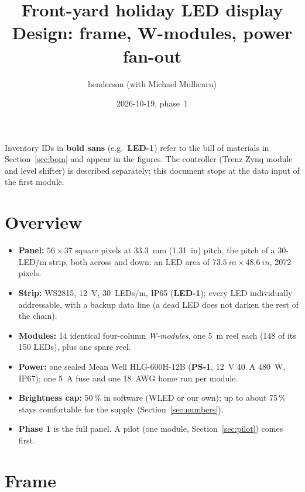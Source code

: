 \documentclass[11pt,letterpaper]{article}
\title{Front-yard holiday LED display\\[2pt]\large Design: frame, W-modules, power fan-out}
\author{henderson (with Michael Mulhearn)}
\date{2026-10-19, phase~1}
\newcommand{\id}[1]{\textsf{\textbf{#1}}}  %
\begin{document}
\maketitle

\noindent Inventory IDs in \id{bold sans} (e.g.\ \id{LED-1}) refer to the bill of materials in
Section~\ref{sec:bom} and appear in the figures.  The controller (Trenz Zynq module and level shifter) is
described separately; this document stops at the data input of the first module.

\section{Overview}

\begin{itemize}
  \item \textbf{Panel:} $56 \times 37$ square pixels at \SI{33.3}{mm} (\SI{1.31}{in}) pitch, the pitch of a
    30-LED/m strip, both across and down: an LED area of $\SI{73.5}{in} \times \SI{48.6}{in}$, 2072 pixels.
  \item \textbf{Strip:} WS2815, \SI{12}{V}, 30~LEDs/m, IP65 (\id{LED-1}); every LED individually addressable,
    with a backup data line (a dead LED does not darken the rest of the chain).
  \item \textbf{Modules:} 14 identical four-column \emph{W-modules}, one \SI{5}{m} reel each (148 of its 150
    LEDs), plus one spare reel.
  \item \textbf{Power:} one sealed Mean Well HLG-600H-12B (\id{PS-1}, \SI{12}{V} \SI{40}{A} \SI{480}{W}, IP67);
    one \SI{5}{A} fuse and one 18~AWG home run per module.
  \item \textbf{Brightness cap:} 50\,\% in software (WLED or our own); up to about 75\,\% stays comfortable for
    the supply (Section~\ref{sec:numbers}).
  \item \textbf{Phase 1} is the full panel.  A pilot (one module, Section~\ref{sec:pilot}) comes first.
\end{itemize}

\section{Frame}
\end{document}

